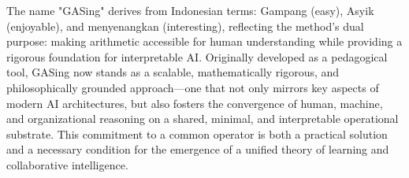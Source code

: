 The name "GASing" derives from Indonesian terms: Gampang (easy), Asyik (enjoyable), and menyenangkan (interesting), reflecting the method’s dual purpose: making arithmetic accessible for human understanding while providing a rigorous foundation for interpretable AI. Originally developed as a pedagogical tool, GASing now stands as a scalable, mathematically rigorous, and philosophically grounded approach—one that not only mirrors key aspects of modern AI architectures, but also fosters the convergence of human, machine, and organizational reasoning on a shared, minimal, and interpretable operational substrate. This commitment to a common operator is both a practical solution and a necessary condition for the emergence of a unified theory of learning and collaborative intelligence.
